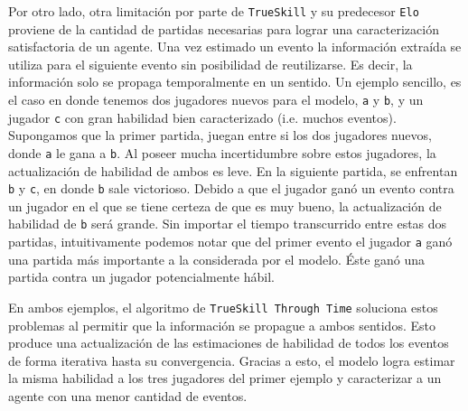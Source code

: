\documentclass[11pt,twoside,spanish]{report} %
\begin{document}
Por otro lado, otra limitaci\'on por parte de \texttt{TrueSkill} y su predecesor \texttt{Elo} proviene de la cantidad de partidas necesarias para lograr una caracterizaci\'on satisfactoria de un agente.
Una vez estimado un evento la informaci\'on extra\'ida se utiliza para el siguiente evento sin posibilidad de reutilizarse.
Es decir, la informaci\'on solo se propaga temporalmente en un sentido.
Un ejemplo sencillo, es el caso en donde tenemos dos jugadores nuevos para el modelo, \texttt{a} y \texttt{b}, y un jugador \texttt{c} con gran habilidad bien caracterizado (i.e. muchos eventos).
Supongamos que la primer partida, juegan entre si los dos jugadores nuevos, donde \texttt{a} le gana a  \texttt{b}.
Al poseer mucha incertidumbre sobre estos jugadores, la actualizaci\'on de habilidad de ambos es leve.
En la siguiente partida, se enfrentan \texttt{b} y \texttt{c}, en donde \texttt{b} sale victorioso. 
Debido a que el jugador gan\'o un evento contra un jugador en el que se tiene certeza de que es muy bueno, la actualizaci\'on de habilidad de \texttt{b} ser\'a grande.
Sin importar el tiempo transcurrido entre estas dos partidas, intuitivamente podemos notar que del primer evento el jugador  \texttt{a}  gan\'o una partida m\'as importante a la considerada por el modelo.
\'Este gan\'o una partida contra un jugador potencialmente h\'abil.

En  ambos ejemplos, el algoritmo de \texttt{TrueSkill Through Time} soluciona estos problemas al permitir que la informaci\'on se propague a ambos sentidos.
Esto produce una actualizaci\'on de las estimaciones de habilidad de todos los eventos de forma iterativa hasta su convergencia.
Gracias a esto, el modelo logra estimar la misma habilidad a los tres jugadores del primer ejemplo y caracterizar a un agente con una menor cantidad de eventos.

% 
% 
% 
% 
\end{document}

